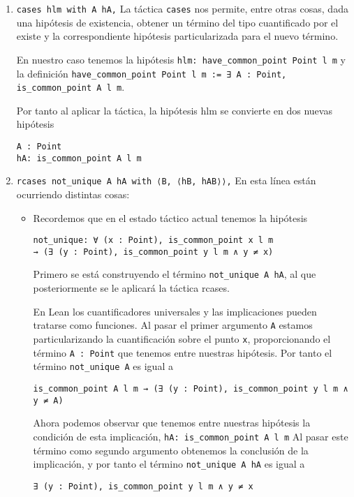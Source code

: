 \begin{enumerate}[label=L.\arabic*, topsep=0mm]
	\item \lstinline{cases hlm with A hA,} La táctica \lstinline{cases} nos
	      permite, entre otras cosas, dada una hipótesis de existencia, obtener un
	      término del tipo cuantificado por el existe y la correspondiente hipótesis
	      particularizada para el nuevo término.

	      En nuestro caso tenemos la hipótesis \lstinline{hlm: have_common_point Point l m} y la definición
	      \lstinline{have_common_point Point l m := ∃ A : Point, is_common_point A l m}.

	      Por tanto al aplicar la táctica, la hipótesis hlm se convierte en dos
	      nuevas hipótesis
	      \begin{lstlisting}
A : Point 
hA: is_common_point A l m
\end{lstlisting}

	\item \lstinline{rcases not_unique A hA with ⟨B, ⟨hB, hAB⟩⟩,} En esta línea
	      están ocurriendo distintas cosas:
	      \begin{itemize}
		      \item Recordemos que en el estado táctico actual tenemos la hipótesis
		            \begin{lstlisting}
not_unique: ∀ (x : Point), is_common_point x l m 
→ (∃ (y : Point), is_common_point y l m ∧ y ≠ x) 
\end{lstlisting}

		            Primero se está construyendo el término \lstinline{not_unique A hA},
		            al que posteriormente se le aplicará la táctica {rcases}.

		            En Lean los cuantificadores universales y las implicaciones pueden
		            tratarse como funciones. Al pasar el primer argumento \lstinline{A}
		            estamos particularizando la cuantificación sobre el punto
		            \lstinline{x}, proporcionando el término \lstinline{A : Point} que
		            tenemos entre nuestras hipótesis. Por tanto el término
		            \lstinline{not_unique A} es igual a
		            \begin{lstlisting}
is_common_point A l m → (∃ (y : Point), is_common_point y l m ∧ y ≠ A)
\end{lstlisting}

		            Ahora podemos observar que tenemos entre nuestras hipótesis la
		            condición de esta implicación, \lstinline{hA: is_common_point A l m}
		            Al pasar este término como segundo argumento obtenemos la conclusión
		            de la implicación, y por tanto el término
		            \lstinline{not_unique A hA} es igual a
		            \begin{lstlisting}
∃ (y : Point), is_common_point y l m ∧ y ≠ x
\end{lstlisting}


\end{itemize}
\end{enumerate}
